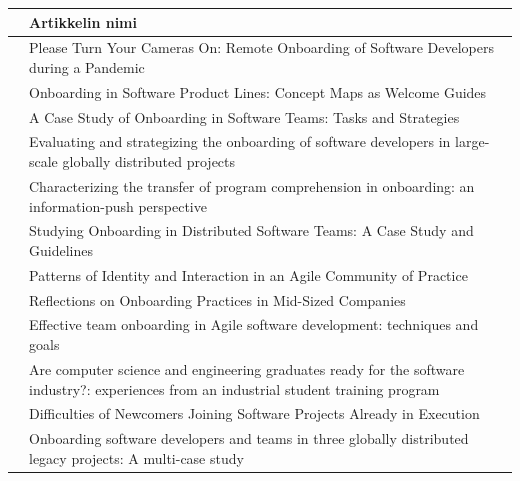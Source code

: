 \documentclass[utf8]{gradu3}
\begin{document}
\begin{table}\fontsize{10}{7.2}\selectfont
\begin{tabular}{p{3.5cm}p{12cm}}
        & Artikkelin nimi  \\
\toprule

 \textcite{rodeghero-ym-2021} & Please Turn Your Cameras On: Remote Onboarding of Software Developers during a Pandemic \\

\midrule
\textcite{azanza-ym-2021} & Onboarding in Software Product Lines: Concept Maps as Welcome Guides \\

\midrule
\textcite{ju-ym-2021} & A Case Study of Onboarding in Software Teams: Tasks and Strategies \\

\midrule
\textcite{britto-ym-2020} & Evaluating and strategizing the onboarding of software developers in large-scale globally distributed projects\\

\midrule
\textcite{yates-ym-2020} & Characterizing the transfer of program comprehension in onboarding: an information-push perspective\\

\midrule
\textcite{moe-ym-2020} & Studying Onboarding in Distributed Software Teams: A Case Study and Guidelines \\

\midrule
\textcite{kumar-wallace-2019} & Patterns of Identity and Interaction in an Agile Community of Practice \\

\midrule
\textcite{viviani-murphy-2019} & Reflections on Onboarding Practices in Mid-Sized Companies \\

\midrule
\textcite{buchan-ym-2019} & Effective team onboarding in Agile software development: techniques and goals \\

\midrule
\textcite{tuzun-ym-2018} & Are computer science and engineering graduates ready for the software industry?: experiences from an industrial student training program \\

\midrule
\textcite{matturro-ym-2017} & Difficulties of Newcomers Joining Software Projects Already in Execution \\

\midrule
\textcite{britto-ym-2017} & Onboarding software developers and teams in three globally distributed legacy projects: A multi-case study \\


\end{tabular}
\end{table}
\end{document}
